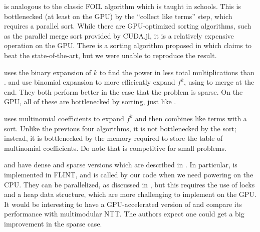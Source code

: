  is analogous to the classic FOIL algorithm which is taught in schools. 
This is bottlenecked (at least on the GPU) by the ``collect like terms'' step, 
which requires a parallel sort.
While there are GPU-optimized sorting algorithms, such as the parallel merge sort
provided by CUDA.jl, it is a relatively expensive operation on the GPU.
There is a sorting algorithm proposed in \cite{gupta-2023-gpu-sort}
which claims to beat the state-of-the-art, but we were unable to reproduce the result.

 uses the binary expansion of \(k\) to find the power in less
total multiplications than .
 and  use binomial expansion to more efficiently 
expand \(f^{k}\), using  to merge at the end.
They both perform better in the case that the problem is sparse.
On the GPU, all of these are bottlenecked by sorting, just like
.

 uses multinomial coefficients to expand \(f^{k}\) 
and then combines like terms with a sort. 
Unlike the previous four algorithms, it is not bottlenecked by the sort;
instead, it is bottlenecked by the memory required to store the table of
multinomial coefficients. Do note that  is 
competitive for small problems.

 and  have dense and sparse versions which are described in 
\cite{monagan-2012-sparse-powering}.
In particular,  is implemented in FLINT, and is called by our
code when we need powering on the CPU.
They can be parallelized, as discussed in \cite{monagan-2012-sparse-powering},
but this requires the use of locks and a heap data structure,
which are more challenging to implement on the GPU.
It would be interesting to have a GPU-accelerated version of
 and compare its performance with 
multimodular NTT.
The authors expect one could get a big improvement in the sparse case.


